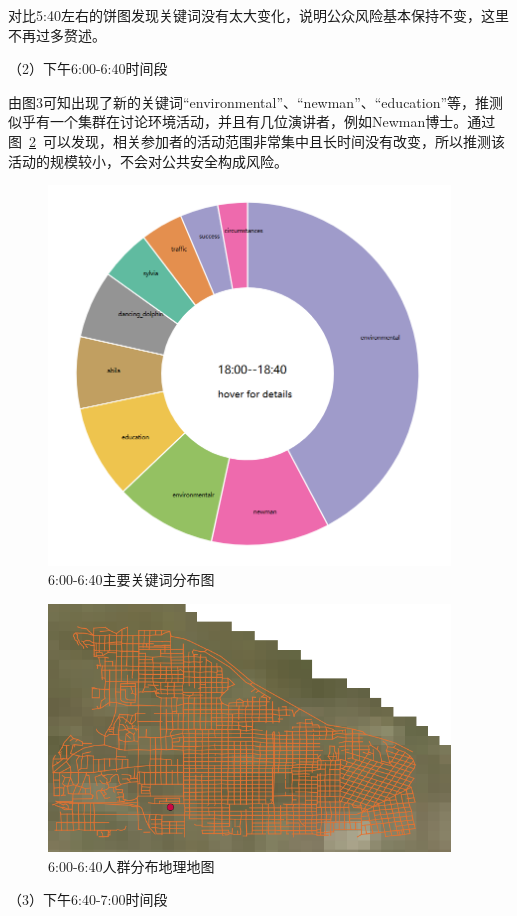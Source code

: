\documentclass[a4paper]{article}
\begin{document}
对比5:40左右的饼图发现关键词没有太大变化，说明公众风险基本保持不变，这里不再过多赘述。

（2）下午6:00-6:40时间段

由图3可知出现了新的关键词“environmental”、“newman”、“education”等，推测似乎有一个集群在讨论环境活动，并且有几位演讲者，例如Newman博士。通过图~\ref{fig:2-4}~可以发现，相关参加者的活动范围非常集中且长时间没有改变，所以推测该活动的规模较小，不会对公共安全构成风险。

\begin{figure}[H]
  \centering
  \includegraphics[width=0.95\textwidth]{images/2-3.png}
  \caption{6:00-6:40主要关键词分布图}\label{fig:2-3}
  \vspace{\baselineskip}
\end{figure}

\begin{figure}[H]
  \centering
  \includegraphics[width=0.95\textwidth]{images/2-4.png}
  \caption{6:00-6:40人群分布地理地图}\label{fig:2-4}
  \vspace{\baselineskip}
\end{figure}
（3）下午6:40-7:00时间段
\end{document}

